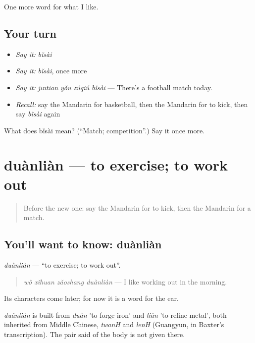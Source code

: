 \begin{grammarlens}[title={What you've built}]
One more word for what I like.
\end{grammarlens}

\subsection*{Your turn}
\begin{itemize}
\raggedright
  \item \emph{Say it:} \emph{bǐsài}
  \item \emph{Say it:} \emph{bǐsài}, once more
  \item \emph{Say it:} \emph{jīntiān yǒu zúqiú bǐsài} — There's a football match today.
  \item \emph{Recall:} say the Mandarin for basketball, then the Mandarin for to kick, then say \emph{bǐsài} again
\end{itemize}

\begin{tcolorbox}[breakable,colback=teal!4,colframe=teal!35!black,title={Before you move on}]
What does bǐsài mean? (\textquotedblleft{}Match; competition\textquotedblright{}.) Say it once more.
\end{tcolorbox}
\section[duànliàn]{duànliàn — to exercise; to work out}

\label{lesson:ZH-C135-duanlian}



\begin{quote}
Before the new one: say the Mandarin for to kick, then the Mandarin for a match.
\end{quote}

\subsection*{You'll want to know: duànliàn}
\emph{duànliàn} — \textquotedblleft{}to exercise; to work out\textquotedblright{}.

\begin{quote}
\emph{wǒ xǐhuan zǎoshang duànliàn} — I like working out in the morning.
\end{quote}

Its characters come later; for now it is a word for the ear.

\begin{cousinweb}
\emph{duànliàn} is built from \emph{duàn} 'to forge iron' and \emph{liàn} 'to refine metal', both inherited from Middle Chinese, \emph{twanH} and \emph{lenH} (Guangyun, in Baxter's transcription). The pair said of the body is not given there.
\end{cousinweb}

